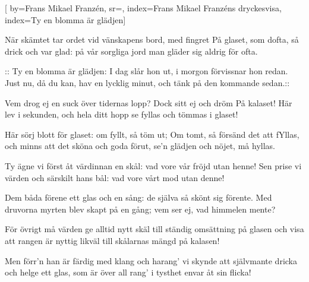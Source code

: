 

[ 		%
	by={Frans Mikael Franzén},					%
	sr={},					%
	index={Frans Mikael Franzéns dryckesvisa}, %
	index={Ty en blomma är glädjen}]						%
	
\beginverse*						%
När skämtet tar ordet vid vänskapens bord,
med fingret På glaset, som dofta,
så drick och var glad: på vår sorgliga jord
man gläder sig aldrig för ofta.
\endverse							%

\beginchorus						%
:: Ty en blomma är glädjen: I dag slår hon ut,
i morgon förvissnar hon redan.
Just nu, då du kan, hav en lycklig minut,
och tänk på den kommande sedan.::
\endchorus							%

\beginverse*						%
Vem drog ej en suck över tidernas lopp?
Dock sitt ej och dröm På kalaset!
Här lev i sekunden, och hela ditt hopp
se fyllas och tömmas i glaset!
\endverse							%

\beginchorus						%
Här sörj blott för glaset: om fyllt, så töm ut;
Om tomt, så försänd det att fYllas,
och minns att det sköna och goda förut,
se'n glädjen och nöjet, må hyllas.
\endchorus							%

\beginverse*						%
Ty ägne vi först åt värdinnan en skål:
vad vore vår fröjd utan henne!
Sen prise vi värden och särskilt hans bål:
vad vore vårt mod utan denne!
\endverse							%

\beginchorus						%
Dem båda förene ett glas och en sång:
de själva så skönt sig förente.
Med druvorna myrten blev skapt på en gång;
vem ser ej, vad himmelen mente?
\endchorus

\beginverse*						%
För övrigt må värden ge alltid nytt skäl
till ständig omsättning på glasen
och visa att rangen är nyttig likväl
till skålarnas mängd på kalasen!
\endverse							%

\beginchorus						%
Men förr'n han är färdig med klang och harang'
vi skynde att självmante dricka
och helge ett glas, som är över all rang'
i tysthet envar åt sin flicka!
\endchorus							%

\endsong							%